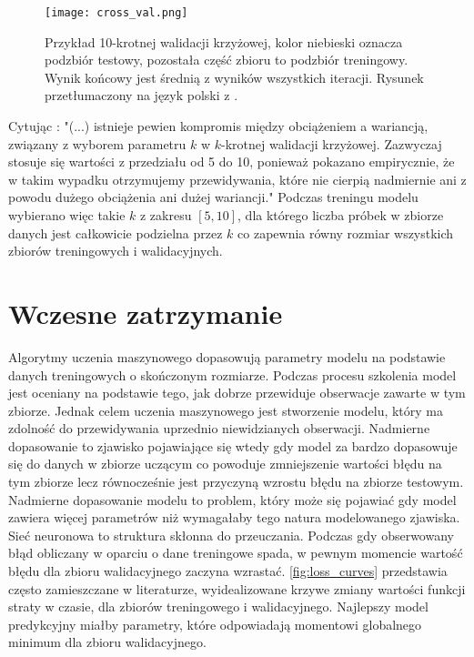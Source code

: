\documentclass[11pt]{book}
\theoremstyle{definition}
\begin{document}
\begin{figure}[htp!]
	\centering
	\texttt{[image: cross\_val.png]}
	\caption{Przykład 10-krotnej walidacji krzyżowej, kolor niebieski oznacza podzbiór testowy, pozostała część zbioru to podzbiór treningowy. Wynik końcowy jest średnią z wyników wszystkich iteracji. Rysunek przetłumaczony na język polski z \cite{Raschka:2015:PML:2886323}.}
	\label{fig:cross-val}
\end{figure}

Cytując \cite{James:2014:ISL:2517747}: "(...) istnieje pewien kompromis między obciążeniem a wariancją, związany z wyborem parametru $k$ w $k$-krotnej walidacji krzyżowej. Zazwyczaj stosuje się wartości z przedziału od 5 do 10, ponieważ pokazano empirycznie, że w takim wypadku otrzymujemy przewidywania, które nie cierpią nadmiernie ani z powodu dużego obciążenia ani dużej wariancji." Podczas treningu modelu wybierano więc takie $k$ z zakresu $[5,10]$, dla którego liczba próbek w zbiorze danych jest całkowicie podzielna przez $k$ co zapewnia równy rozmiar wszystkich zbiorów treningowych i walidacyjnych.

\section{Wczesne zatrzymanie}
 \label{wcz_zat}
 
Algorytmy uczenia maszynowego dopasowują parametry modelu na podstawie danych treningowych o skończonym rozmiarze. Podczas procesu szkolenia model jest oceniany na podstawie tego, jak dobrze przewiduje obserwacje zawarte w tym zbiorze. Jednak celem uczenia maszynowego jest stworzenie modelu, który ma zdolność do przewidywania uprzednio niewidzianych obserwacji. Nadmierne dopasowanie to zjawisko pojawiające się wtedy gdy model za bardzo dopasowuje się do danych w zbiorze uczącym co powoduje zmniejszenie wartości błędu na tym zbiorze lecz równocześnie jest przyczyną wzrostu błędu na zbiorze testowym. Nadmierne dopasowanie modelu to problem, który może się pojawiać gdy model zawiera więcej parametrów niż wymagałaby tego natura modelowanego zjawiska. Sieć neuronowa to struktura skłonna do przeuczania. Podczas gdy obserwowany błąd obliczany w oparciu o dane treningowe spada, w pewnym momencie wartość błędu dla zbioru walidacyjnego zaczyna wzrastać. \figurename{} \ref{fig:loss_curves} przedstawia często zamieszczane w literaturze, wyidealizowane krzywe zmiany wartości funkcji straty w czasie, dla zbiorów treningowego i walidacyjnego. Najlepszy model predykcyjny miałby parametry, które odpowiadają momentowi globalnego minimum dla zbioru walidacyjnego.
\end{document}
